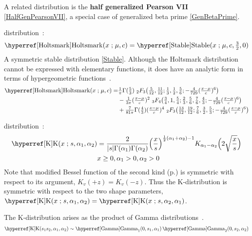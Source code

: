 A related distribution is the {\bf half generalized Pearson VII} \eqref{HalfGenPearsonVII}, a special case of generalized beta prime 
\eqref{GenBetaPrime}.


\secbreak
 distribution~\cite{Holtsmark1919}:
\begin{align}
	\label{Holtsmark}
	\opr{Holtsmark}(x\given \mu,c) = \opr{Stable}(x\given \mu,c,\sfrac{3}{2},0)  \checked
\end{align}
A symmetric stable distribution \eqref{Stable}.
Although the Holtsmark distribution cannot be expressed with elementary functions, it does have an analytic form in terms of hypergeometric functions~\cite{Garoni2002}.
\begin{align*}
\opr{Holtsmark}(x\given \mu,c)
=& \sfrac{1}{\pi} {\Gamma(\tfrac{5}{3})}\ {}_2F_3\bigl(\tfrac{5}{12},\tfrac{11}{12};\tfrac{1}{3},\tfrac{1}{2},\sfrac{5}{6};-\sfrac{4}{729}(\sfrac{x-\mu}{c})^6\bigr) \\
& {} - \sfrac{1}{3\pi} (\sfrac{x-\mu}{c})^2 \ {}_3F_4\bigl( \sfrac{3}{4},1,\sfrac{5}{4};\sfrac{2}{3},\sfrac{5}{6},\sfrac{7}{6},\sfrac{4}{3};-\sfrac{4}{729}(\sfrac{x-\mu}{c})^6 \bigr) \\
&  {}  + \sfrac{7}{81\pi}   {\Gamma(\sfrac{4}{3})}  (\sfrac{x-\mu}{c})^4 \  {}_2F_3\bigl( \sfrac{13}{12},\sfrac{19}{12};\sfrac{7}{6},\sfrac{3}{2},\sfrac{5}{3};- \sfrac{4}{729} (\sfrac{x-\mu}{c})^6 \bigr) \checked
\end{align*}

\secbreak
{} distribution~\cite{Malik1968,Jakeman1978,Redding1999,Withers2013}:
\begin{align}
\label{K}
\opr{K}(x\given s, \alpha_1, \alpha_2) &= 
\frac{2}{|s| \Gamma(\alpha_1)\Gamma(\alpha_2)}
 \Bigl( \frac{x}{s} \Bigr)^{\half(\alpha_1+\alpha_2 )-1} K_{\alpha_1-\alpha_2} \Bigl(2 \sqrt{\frac{x}{s}} \Bigr) \checked
\\
& x\geq 0, \alpha_1>0, \alpha_2>0 \notag
\end{align}
Note that modified Bessel function of the second kind  (p.\pageref{ModBesselSecond}) is symmetric with respect to its argument,   $K_{v}(+z)=   K_{v}(-z)$. Thus the K-distribution is symmetric with respect to the two shape parameters, $\opr{K}(x\given s, \alpha_1, \alpha_2)  = \opr{K}(x\given s, \alpha_2,\alpha_1)$.

The K-distribution arises as the product of Gamma distributions~\cite{Malik1968,Redding1999,Withers2013}.
\begin{align*}
\opr{K}(s_1 s_2, \alpha_1, \alpha_2)  
\sim  \opr{Gamma}_1(0,s_1, \alpha_1)  \opr{Gamma}_2(0,s_2, \alpha_2) \checked
\end{align*}


